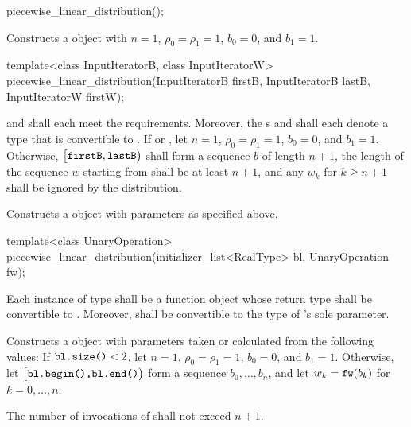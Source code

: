 \begin{itemdecl}
piecewise_linear_distribution();
\end{itemdecl}

\begin{itemdescr}
\pnum\effects Constructs a  object
 with $n = 1$,
 $\rho_0 = \rho_1 = 1$,
 $b_0 = 0$,
 and $b_1 = 1$.
\end{itemdescr}

\begin{itemdecl}
template<class InputIteratorB, class InputIteratorW>
 piecewise_linear_distribution(InputIteratorB firstB, InputIteratorB lastB,
                               InputIteratorW firstW);
\end{itemdecl}

\begin{itemdescr}
\pnum\requires
   and 
  shall each meet the
   requirements.
  Moreover,
  the s
   and
  shall each denote a type that is convertible to .
 If 
 or ,
 let $n = 1$,
     $\rho_0 = \rho_1 = 1$,
     $b_0 = 0$,
 and $b_1 = 1$.
 Otherwise,
 $\bigl[\texttt{firstB}, \texttt{lastB}\bigr)$
 shall form a sequence $b$ of length $n+1$,
 the length of the sequence $w$ starting from 
 shall be at least $n+1$,
 and any $w_k$ for $k \geq n + 1$ shall be ignored by the distribution.

\pnum\effects Constructs a  object
 with parameters as specified above.
\end{itemdescr}


%
\begin{itemdecl}
template<class UnaryOperation>
 piecewise_linear_distribution(initializer_list<RealType> bl, UnaryOperation fw);
\end{itemdecl}

\begin{itemdescr}
\pnum\requires
 Each instance of type 
 shall be a function object
 whose return type shall be convertible to .
 Moreover,
  shall be convertible
 to the type of 's sole parameter.

\pnum\effects Constructs a  object
 with parameters taken or calculated
 from the following values:
 If $\texttt{bl.size()} < 2$,
 let $n = 1$,
     $\rho_0 = \rho_1 = 1$,
     $b_0 = 0$,
 and $b_1 = 1$.
 Otherwise,
 let $\bigl[\texttt{bl.begin(),} \texttt{bl.end()}\bigr)$
 form a sequence $b_0, \dotsc, b_n$,
 and
 let $w_k = \texttt{fw}(b_k)$
 for $k = 0, \dotsc, n$.

\pnum\complexity
 The number of invocations of  shall not exceed $n+1$.
\end{itemdescr}


